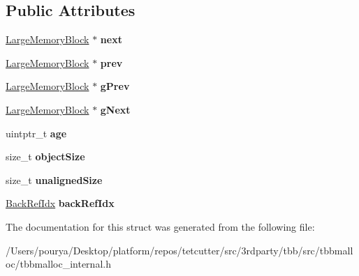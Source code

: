 \subsection*{Public Attributes}
\begin{DoxyCompactItemize}
\item 
\hypertarget{structrml_1_1internal_1_1LargeMemoryBlock_a556cab303968471599e3491cfcbeaeb8}{}\hyperlink{structrml_1_1internal_1_1LargeMemoryBlock}{Large\+Memory\+Block} $\ast$ {\bfseries next}\label{structrml_1_1internal_1_1LargeMemoryBlock_a556cab303968471599e3491cfcbeaeb8}

\item 
\hypertarget{structrml_1_1internal_1_1LargeMemoryBlock_a3687b4a5f07044935f9cef3047e3c285}{}\hyperlink{structrml_1_1internal_1_1LargeMemoryBlock}{Large\+Memory\+Block} $\ast$ {\bfseries prev}\label{structrml_1_1internal_1_1LargeMemoryBlock_a3687b4a5f07044935f9cef3047e3c285}

\item 
\hypertarget{structrml_1_1internal_1_1LargeMemoryBlock_a82d0961bf793ad33d0dc11b0f14be14e}{}\hyperlink{structrml_1_1internal_1_1LargeMemoryBlock}{Large\+Memory\+Block} $\ast$ {\bfseries g\+Prev}\label{structrml_1_1internal_1_1LargeMemoryBlock_a82d0961bf793ad33d0dc11b0f14be14e}

\item 
\hypertarget{structrml_1_1internal_1_1LargeMemoryBlock_a2c2870cb49c99aa7e2438c4662b85b20}{}\hyperlink{structrml_1_1internal_1_1LargeMemoryBlock}{Large\+Memory\+Block} $\ast$ {\bfseries g\+Next}\label{structrml_1_1internal_1_1LargeMemoryBlock_a2c2870cb49c99aa7e2438c4662b85b20}

\item 
\hypertarget{structrml_1_1internal_1_1LargeMemoryBlock_a19d1063456bebeb3c16b5b3b78fd6c58}{}uintptr\+\_\+t {\bfseries age}\label{structrml_1_1internal_1_1LargeMemoryBlock_a19d1063456bebeb3c16b5b3b78fd6c58}

\item 
\hypertarget{structrml_1_1internal_1_1LargeMemoryBlock_a36dc3cf5c0acd49721481eda74838e3b}{}size\+\_\+t {\bfseries object\+Size}\label{structrml_1_1internal_1_1LargeMemoryBlock_a36dc3cf5c0acd49721481eda74838e3b}

\item 
\hypertarget{structrml_1_1internal_1_1LargeMemoryBlock_aaad527f7110e4c9e9a9cfa09411bd0b7}{}size\+\_\+t {\bfseries unaligned\+Size}\label{structrml_1_1internal_1_1LargeMemoryBlock_aaad527f7110e4c9e9a9cfa09411bd0b7}

\item 
\hypertarget{structrml_1_1internal_1_1LargeMemoryBlock_ad97a9f039a803f7f20887a0217b014de}{}\hyperlink{classrml_1_1internal_1_1BackRefIdx}{Back\+Ref\+Idx} {\bfseries back\+Ref\+Idx}\label{structrml_1_1internal_1_1LargeMemoryBlock_ad97a9f039a803f7f20887a0217b014de}

\end{DoxyCompactItemize}


The documentation for this struct was generated from the following file\+:\begin{DoxyCompactItemize}
\item 
/\+Users/pourya/\+Desktop/platform/repos/tetcutter/src/3rdparty/tbb/src/tbbmalloc/tbbmalloc\+\_\+internal.\+h\end{DoxyCompactItemize}
